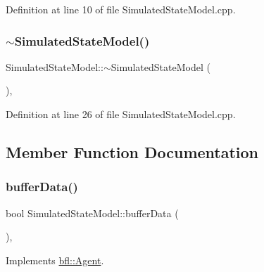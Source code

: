 Definition at line 10 of file Simulated\+State\+Model.\+cpp.

\mbox{\label{classbfl_1_1SimulatedStateModel_a5158e3a4a42075325e26cad6f1a63434}} 
\subsubsection{\texorpdfstring{$\sim$\+Simulated\+State\+Model()}{~SimulatedStateModel()}}
{\footnotesize\ttfamily Simulated\+State\+Model\+::$\sim$\+Simulated\+State\+Model (\begin{DoxyParamCaption}{ }\end{DoxyParamCaption})\hspace{0.3cm}{\ttfamily [virtual]}, {\ttfamily [noexcept]}}



Definition at line 26 of file Simulated\+State\+Model.\+cpp.



\subsection{Member Function Documentation}
\mbox{\label{classbfl_1_1SimulatedStateModel_ae7bc3a9bf9d4ed8a8d1985772380295e}} 
\subsubsection{\texorpdfstring{buffer\+Data()}{bufferData()}}
{\footnotesize\ttfamily bool Simulated\+State\+Model\+::buffer\+Data (\begin{DoxyParamCaption}{ }\end{DoxyParamCaption})\hspace{0.3cm}{\ttfamily [override]}, {\ttfamily [virtual]}}



Implements \mbox{\hyperlink{classbfl_1_1Agent_aceb93f1712a98222af2b02537c09b6dc}{bfl\+::\+Agent}}.



